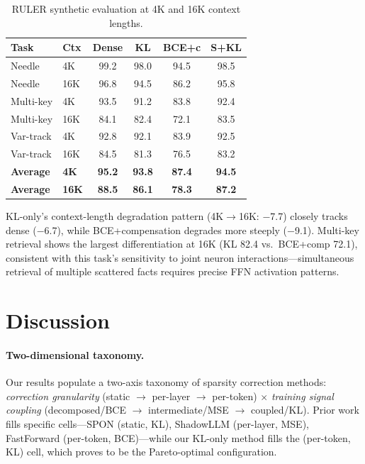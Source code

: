 \documentclass[11pt,a4paper]{article}
\begin{document}
\begin{table}[t]
\centering
\small
\caption{RULER synthetic evaluation at 4K and 16K context lengths.}
\label{tab:ruler}
\begin{tabular}{llcccc}
\toprule
\textbf{Task} & \textbf{Ctx} & \textbf{Dense} & \textbf{KL} & \textbf{BCE+c} & \textbf{S+KL} \\
\midrule
Needle & 4K & 99.2 & 98.0 & 94.5 & 98.5 \\
Needle & 16K & 96.8 & 94.5 & 86.2 & 95.8 \\
Multi-key & 4K & 93.5 & 91.2 & 83.8 & 92.4 \\
Multi-key & 16K & 84.1 & 82.4 & 72.1 & 83.5 \\
Var-track & 4K & 92.8 & 92.1 & 83.9 & 92.5 \\
Var-track & 16K & 84.5 & 81.3 & 76.5 & 83.2 \\
\midrule
\textbf{Average} & \textbf{4K} & \textbf{95.2} & \textbf{93.8} & \textbf{87.4} & \textbf{94.5} \\
\textbf{Average} & \textbf{16K} & \textbf{88.5} & \textbf{86.1} & \textbf{78.3} & \textbf{87.2} \\
\bottomrule
\end{tabular}
\end{table}

KL-only's context-length degradation pattern (4K$\to$16K: $-$7.7) closely tracks dense ($-$6.7), while BCE+compensation degrades more steeply ($-$9.1).
Multi-key retrieval shows the largest differentiation at 16K (KL 82.4 vs.\ BCE+comp 72.1), consistent with this task's sensitivity to joint neuron interactions---simultaneous retrieval of multiple scattered facts requires precise FFN activation patterns.

\section{Discussion}

\paragraph{Two-dimensional taxonomy.}
Our results populate a two-axis taxonomy of sparsity correction methods: \emph{correction granularity} (static $\to$ per-layer $\to$ per-token) $\times$ \emph{training signal coupling} (decomposed/BCE $\to$ intermediate/MSE $\to$ coupled/KL).
Prior work fills specific cells---SPON (static, KL), ShadowLLM (per-layer, MSE), FastForward (per-token, BCE)---while our KL-only method fills the (per-token, KL) cell, which proves to be the Pareto-optimal configuration.
\end{document}
